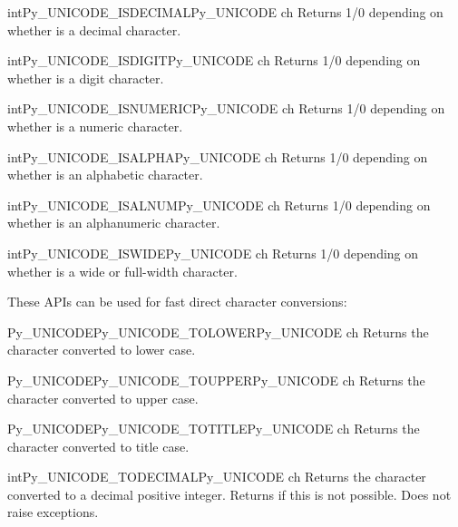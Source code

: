 \begin{cfuncdesc}{int}{Py_UNICODE_ISDECIMAL}{Py_UNICODE ch}
  Returns 1/0 depending on whether  is a decimal character.
\end{cfuncdesc}

\begin{cfuncdesc}{int}{Py_UNICODE_ISDIGIT}{Py_UNICODE ch}
  Returns 1/0 depending on whether  is a digit character.
\end{cfuncdesc}

\begin{cfuncdesc}{int}{Py_UNICODE_ISNUMERIC}{Py_UNICODE ch}
  Returns 1/0 depending on whether  is a numeric character.
\end{cfuncdesc}

\begin{cfuncdesc}{int}{Py_UNICODE_ISALPHA}{Py_UNICODE ch}
  Returns 1/0 depending on whether  is an alphabetic
  character.
\end{cfuncdesc}

\begin{cfuncdesc}{int}{Py_UNICODE_ISALNUM}{Py_UNICODE ch}
  Returns 1/0 depending on whether  is an alphanumeric
  character.
\end{cfuncdesc}

\begin{cfuncdesc}{int}{Py_UNICODE_ISWIDE}{Py_UNICODE ch}
  Returns 1/0 depending on whether  is a wide or full-width
  character.
\end{cfuncdesc}

These APIs can be used for fast direct character conversions:

\begin{cfuncdesc}{Py_UNICODE}{Py_UNICODE_TOLOWER}{Py_UNICODE ch}
  Returns the character  converted to lower case.
\end{cfuncdesc}

\begin{cfuncdesc}{Py_UNICODE}{Py_UNICODE_TOUPPER}{Py_UNICODE ch}
  Returns the character  converted to upper case.
\end{cfuncdesc}

\begin{cfuncdesc}{Py_UNICODE}{Py_UNICODE_TOTITLE}{Py_UNICODE ch}
  Returns the character  converted to title case.
\end{cfuncdesc}

\begin{cfuncdesc}{int}{Py_UNICODE_TODECIMAL}{Py_UNICODE ch}
  Returns the character  converted to a decimal positive
  integer.  Returns  if this is not possible.  Does not raise
  exceptions.
\end{cfuncdesc}

